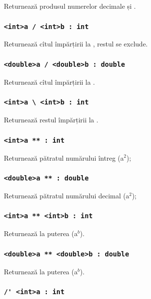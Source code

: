 Returnează produsul numerelor decimale  și .

\subsubsection{\lstinline|<int>a / <int>b : int|}

Returnează cîtul împărțirii  la , restul se exclude.

\subsubsection{\lstinline|<double>a / <double>b : double|}

Returnează cîtul împărțirii  la .

\subsubsection{\lstinline|<int>a \ <int>b : int|}

Returnează restul împărțirii  la .


\subsubsection{\lstinline|<int>a ** : int|}

Returnează pătratul numărului întreg  (a$^2$);

\subsubsection{\lstinline|<double>a ** : double|}

Returnează pătratul numărului decimal  (a$^2$);

\subsubsection{\lstinline|<int>a ** <int>b : int|}

Returnează  la puterea  (a$^b$).

\subsubsection{\lstinline|<double>a ** <double>b : double|}

Returnează  la puterea  (a$^b$).

\subsubsection{\lstinline|/' <int>a : int|}


